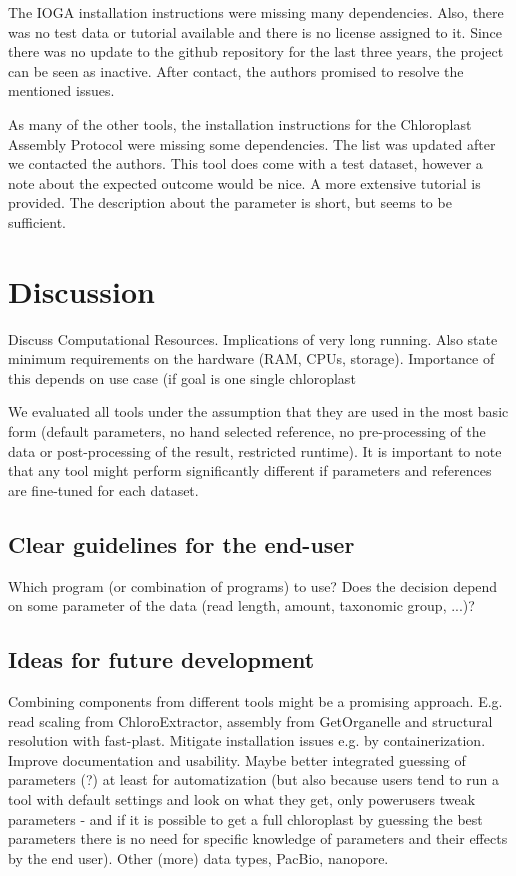 \documentclass{bmcart}
\begin{document}
The IOGA installation instructions were missing many dependencies. Also, there was no test data or tutorial available and there is no license assigned to it. Since there was no update to the github repository for the last three years, the project can be seen as inactive. After contact, the authors promised to resolve the mentioned issues.

As many of the other tools, the installation instructions for the Chloroplast Assembly Protocol were missing some dependencies. The list was updated after we contacted the authors. This tool does come with a test dataset, however a note about the expected outcome would be nice. A more extensive tutorial is provided. The description about the parameter is short, but seems to be sufficient.



\section*{Discussion}
Discuss Computational Resources. Implications of very long running. Also state minimum requirements on the hardware (RAM, CPUs, storage). Importance of this depends on use case (if goal is one single chloroplast 

We evaluated all tools under the assumption that they are used in the most basic form (default parameters, no hand selected reference, no pre-processing of the data or post-processing of the result, restricted runtime). It is important to note that any tool might perform significantly different if parameters and references are fine-tuned for each dataset.

\subsection*{Clear guidelines for the end-user}
Which program (or combination of programs) to use? Does the decision depend on some parameter of the data (read length, amount, taxonomic group, ...)?

\subsection*{Ideas for future development}
Combining components from different tools might be a promising approach. E.g. read scaling from ChloroExtractor, assembly from GetOrganelle and structural resolution with fast-plast.
Mitigate installation issues e.g. by containerization.
Improve documentation and usability.
Maybe better integrated guessing of parameters (?) at least for automatization (but also because users tend to run a tool with default settings and look on what they get, only powerusers tweak parameters - and if it is possible to get a full chloroplast by guessing the best parameters there is no need for specific knowledge of parameters and their effects by the end user).
Other (more) data types, PacBio, nanopore.
\end{document}
